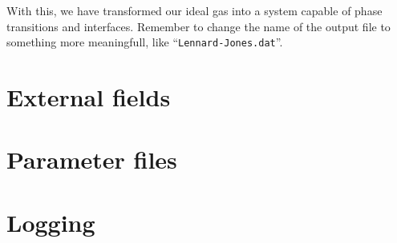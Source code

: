 With this, we have transformed our ideal gas into a system capable of phase
transitions and interfaces. Remember to change the name of the output file to
something more meaningfull, like ``\texttt{Lennard-Jones.dat}''.

\section{External fields}

\section{Parameter files}

\section{Logging}

